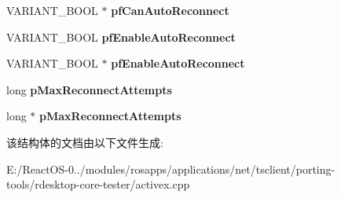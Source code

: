 \begin{DoxyCompactItemize}
V\+A\+R\+I\+A\+N\+T\+\_\+\+B\+O\+OL $\ast$ {\bfseries pf\+Can\+Auto\+Reconnect}
\item 
\mbox{\label{struct_m_s_t_s_c_lib_1_1_i_ms_rdp_client_advanced_settings2_vtbl_a1d7a51b50f874aafc1e866cd35cf5c60}} 
V\+A\+R\+I\+A\+N\+T\+\_\+\+B\+O\+OL {\bfseries pf\+Enable\+Auto\+Reconnect}
\item 
\mbox{\label{struct_m_s_t_s_c_lib_1_1_i_ms_rdp_client_advanced_settings2_vtbl_a35929cf6e7e37a81e0a012222de78e78}} 
V\+A\+R\+I\+A\+N\+T\+\_\+\+B\+O\+OL $\ast$ {\bfseries pf\+Enable\+Auto\+Reconnect}
\item 
\mbox{\label{struct_m_s_t_s_c_lib_1_1_i_ms_rdp_client_advanced_settings2_vtbl_ab2dd9b472faf8da84f34c85474d7797c}} 
long {\bfseries p\+Max\+Reconnect\+Attempts}
\item 
\mbox{\label{struct_m_s_t_s_c_lib_1_1_i_ms_rdp_client_advanced_settings2_vtbl_aebba87c18ce5ae773a451a06e799dcd7}} 
long $\ast$ {\bfseries p\+Max\+Reconnect\+Attempts}
\end{DoxyCompactItemize}


该结构体的文档由以下文件生成\+:\begin{DoxyCompactItemize}
\item 
E\+:/\+React\+O\+S-\/0../modules/rosapps/applications/net/tsclient/porting-\/tools/rdesktop-\/core-\/tester/activex.\+cpp\end{DoxyCompactItemize}
